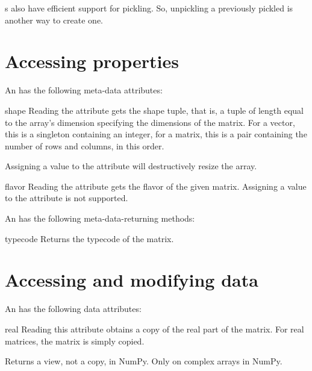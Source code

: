 s also have efficient support for pickling. So, unpickling
a previously pickled  is another way to create one.

\section{Accessing  properties}

\label{sec:arrayproperties}
An  has the following meta-data attributes:

\begin{memberdesc}[Array]{shape}
  Reading the  attribute gets the shape tuple, that is,
  a tuple of length equal to the array's dimension specifying the
  dimensions of the matrix.  For a vector, this is a singleton
  containing an integer, for a matrix, this is a pair containing the
  number of rows and columns, in this order.  

  Assigning a value to the  attribute will destructively
  resize the array.
\end{memberdesc}

\begin{memberdesc}[Array]{flavor}
  Reading the  attribute gets the flavor of the given
  matrix. Assigning a value to the  attribute is not supported.
\end{memberdesc}

An  has the following meta-data-returning methods:

\begin{methoddesc}[Array]{typecode}{}
  Returns the typecode of the matrix.
\end{methoddesc}

\section{Accessing and modifying  data}

An  has the following data attributes:

\begin{memberdesc}[Array]{real}
  Reading this attribute obtains a copy of the real part of the matrix.
  For real matrices, the matrix is simply copied.

  Returns a view, not a copy, in NumPy. Only on complex arrays in NumPy.
\end{memberdesc}

